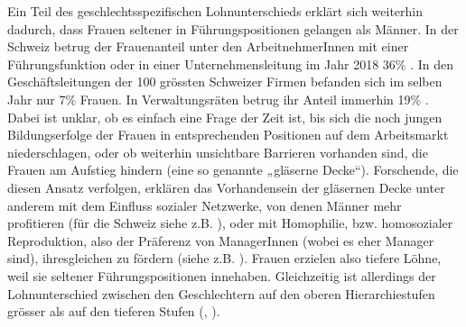 \documentclass[a4paper,12pt]{article}
\begin{document}
Ein Teil des geschlechtsspezifischen Lohnunterschieds erklärt sich weiterhin dadurch, dass Frauen
seltener in Führungspositionen gelangen als Männer. In der Schweiz betrug der
Frauenanteil unter den ArbeitnehmerInnen mit einer Führungsfunktion oder in
einer Unternehmensleitung im Jahr 2018 36\% \citep{BFS-2019c}. In den
Geschäftsleitungen der 100 grössten Schweizer Firmen befanden sich im selben
Jahr nur 7\% Frauen. In Verwaltungsräten betrug ihr Anteil immerhin 19\%
\citep{Schillingreport-2018}. Dabei ist unklar, ob es einfach eine Frage der
Zeit ist, bis sich die noch jungen Bildungserfolge der Frauen in entsprechenden
Positionen auf dem Arbeitsmarkt niederschlagen, oder ob weiterhin unsichtbare
Barrieren vorhanden sind, die Frauen am Aufstieg hindern (eine so genannte
„gläserne Decke“). Forschende, die diesen Ansatz verfolgen, erklären das
Vorhandensein der gläsernen Decke unter anderem mit dem Einfluss sozialer
Netzwerke, von denen Männer mehr profitieren (für die Schweiz siehe z.B.
\citealp{Rost-2010}), oder mit Homophilie, bzw. homosozialer Reproduktion, also
der Präferenz von ManagerInnen (wobei es eher Manager sind), ihresgleichen zu
fördern (siehe z.B. \citealp{Bihagen-Ohls-2006,Holst-Wiemer-2010,Ochsenfeld-2012}). Frauen erzielen
also tiefere Löhne, weil sie seltener Führungspositionen innehaben.
Gleichzeitig ist allerdings der Lohnunterschied zwischen den Geschlechtern auf
den oberen Hierarchiestufen grösser als auf den tieferen Stufen
(\citealp{Blau-Kahn-2016}, \citealp[42]{Strub-Bannwart-2017}).
\end{document}
